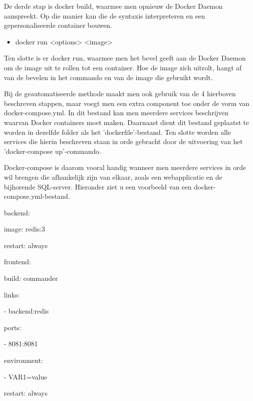 De derde stap is docker build, waarmee men opnieuw de Docker Daemon aanspreekt. Op die manier kan die de syntaxis interpreteren en een gepersonaliseerde container bouwen.

\begin{itemize}[noitemsep]
	\item docker run <options> <image>
\end{itemize}

Ten slotte is er docker run, waarmee men het bevel geeft aan de Docker Daemon om de image uit te rollen tot een container. Hoe de image zich uitrolt, hangt af van de bevelen in het commando en van de image die gebruikt wordt. \autocite{TutorialsPoint2018}

Bij de geautomatiseerde methode maakt men ook gebruik van de 4 hierboven beschreven stappen, maar voegt men een extra component toe onder de vorm van docker-compose.yml. In dit bestand kan men meerdere services beschrijven waarvan Docker containers moet maken. Daarnaast dient dit bestand geplaatst te worden in dezelfde folder als het 'dockerfile'-bestand. Ten slotte worden alle services die hierin beschreven staan in orde gebracht door de uitvoering van het 'docker-compose up'-commando.

Docker-compose is daarom vooral handig wanneer men meerdere services in orde wil brengen die afhankelijk zijn van elkaar, zoals een webapplicatie en de bijhorende SQL-server. Hieronder ziet u een voorbeeld van een docker-compose.yml-bestand. \autocite{Janetakis2017}

backend: 

image: redis:3 

restart: always

frontend: 

build: commander 

links: 

- backend:redis  

ports: 

- 8081:8081 

environment: 

- VAR1=value 

restart: always

